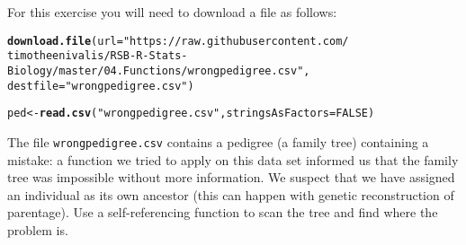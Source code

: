 \documentclass[12pt,a4paper]{scrartcl}\usepackage[]{graphicx}\usepackage[]{color}
\makeatletter
\newcommand{\hlnum}[1]{\textcolor[rgb]{0.686,0.059,0.569}{#1}}%
\newcommand{\hlstr}[1]{\textcolor[rgb]{0.192,0.494,0.8}{#1}}%
\newcommand{\hlstd}[1]{\textcolor[rgb]{0.345,0.345,0.345}{#1}}%
\newcommand{\hlkwb}[1]{\textcolor[rgb]{0.69,0.353,0.396}{#1}}%
\newcommand{\hlkwc}[1]{\textcolor[rgb]{0.333,0.667,0.333}{#1}}%
\newcommand{\hlkwd}[1]{\textcolor[rgb]{0.737,0.353,0.396}{\textbf{#1}}}%
\newenvironment{kframe}{%
 \def\at@end@of@kframe{}%
 \ifinner\ifhmode%
  \def\at@end@of@kframe{\end{minipage}}%
  \begin{minipage}{\columnwidth}%
 \fi\fi%
 \def\FrameCommand##1{\hskip\@totalleftmargin \hskip-\fboxsep
 \colorbox{shadecolor}{##1}\hskip-\fboxsep
     \hskip-\linewidth \hskip-\@totalleftmargin \hskip\columnwidth}%
 \MakeFramed {\advance\hsize-\width
   \@totalleftmargin\z@ \linewidth\hsize
   \@setminipage}}%
 {\par\unskip\endMakeFramed%
 \at@end@of@kframe}
\newenvironment{knitrout}{}{} %
\makeatother
\begin{document}
\begin{Exercise}[difficulty=3, title={Find a mistake in a family tree (Challenging!)}]
For this exercise you will need to download a file as follows: 
\begin{knitrout}
\color{fgcolor}\begin{kframe}
\begin{alltt}
\hlkwd{download.file}\hlstd{(}\hlkwc{url}\hlstd{=}\hlstr{"https://raw.githubusercontent.com/
timotheenivalis/RSB-R-Stats-Biology/master/04.Functions/wrongpedigree.csv"}\hlstd{,}
\hlkwc{destfile} \hlstd{=} \hlstr{"wrongpedigree.csv"}\hlstd{)}

\hlstd{ped} \hlkwb{<-} \hlkwd{read.csv}\hlstd{(}\hlstr{"wrongpedigree.csv"}\hlstd{,} \hlkwc{stringsAsFactors} \hlstd{=} \hlnum{FALSE}\hlstd{)}
\end{alltt}
\end{kframe}
\end{knitrout}

The file \texttt{wrongpedigree.csv} contains a pedigree (a family tree) containing a mistake: a function we tried to apply on this data set informed us that the family tree was impossible without more information. We suspect that we have assigned an individual as its own ancestor (this can happen with genetic reconstruction of parentage). Use a self-referencing function to scan the tree and find where the problem is.
\end{Exercise}
\end{document}
